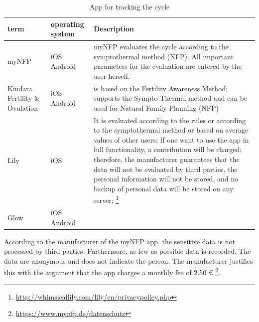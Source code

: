 \begin{table}[htb]
	\caption{App for tracking the cycle}
	\label{tab:typ_of_app_for_tracking_cycle}
	\scriptsize
	\begin{center}
		\begin{tabular}{|p{1.5cm}|p{1cm}|p{4.5cm}|}
			\hline
			term & operating system  & Description \\
			\hline
			\hline
			myNFP &  iOS \newline Android &  myNFP evaluates the cycle according to the symptothermal method (NFP). All important parameters for the evaluation are entered by the user herself.
			\\
			\hline
			Kindara Fertility \& Ovulation  & iOS \newline Android & is based on the Fertility Awareness Method; supports the Sympto-Thermal method and can be used for Natural Family Planning (NFP) \\
			\hline
			Lily & iOS & It is evaluated according to the rules or according to the symptothermal method or based on average values of other users;
			If one want to use the app in full functionality, a contribution will be charged; therefore, the manufacturer guarantees that the data will not be evaluated by third parties, the personal information will not be stored, and no backup of personal data will be stored on any server; \footnote{\url{http://whimsicallily.com/lily/en/privacypolicy.php}} \\
			\hline
			Glow & iOS \newline Android & \\
			\hline
		\end{tabular}
	\end{center}
\end{table}

According to the manufacturer of the myNFP app, the sensitive data is not processed by third parties. Furthermore, as few as possible data is recorded. The data are anonymous and does not indicate the person. The manufacturer justifies this with the argument that the app charges a monthly fee of 2.50 \euro{} \footnote{\url{https://www.mynfp.de/datenschutz}}.

